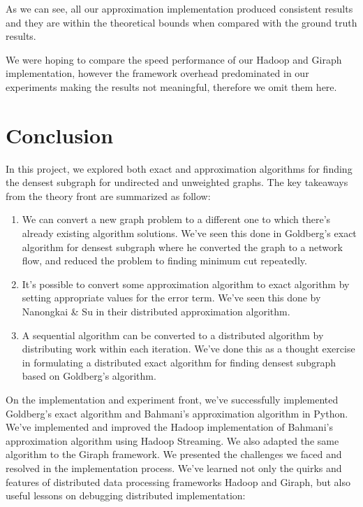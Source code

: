\documentclass{article}
\begin{document}
\begin{landscape}
As we can see, all our approximation implementation produced consistent results and they are within the theoretical bounds when compared with the ground truth results.

We were hoping to compare the speed performance of our Hadoop and Giraph implementation, however the framework overhead predominated in our experiments making the results not meaningful, therefore we omit them here.

\end{landscape}


\section{Conclusion}
In this project, we explored both exact and approximation algorithms for finding the densest subgraph for undirected and unweighted graphs. The key takeaways from the theory front are summarized as follow:

\begin{enumerate}
  \item We can convert a new graph problem to a different one to which there's already existing algorithm solutions. We've seen this done in Goldberg's exact algorithm for densest subgraph where he converted the graph to a network flow, and reduced the problem to finding minimum cut repeatedly.
  \item It's possible to convert some approximation algorithm to exact algorithm by setting appropriate values for the error term. We've seen this done by Nanongkai \& Su in their distributed approximation algorithm.
  \item A sequential algorithm can be converted to a distributed algorithm by distributing work within each iteration. We've done this as a thought exercise in formulating a distributed exact algorithm for finding densest subgraph based on Goldberg's algorithm.
\end{enumerate}

On the implementation and experiment front, we've successfully implemented Goldberg's exact algorithm and Bahmani's approximation algorithm in Python. We've implemented and improved the Hadoop implementation of Bahmani's approximation algorithm using Hadoop Streaming. We also adapted the same algorithm to the Giraph framework. We presented the challenges we faced and resolved in the implementation process. We've learned not only the quirks and features of distributed data processing frameworks Hadoop and Giraph, but also useful lessons on debugging distributed implementation:
\end{document}
